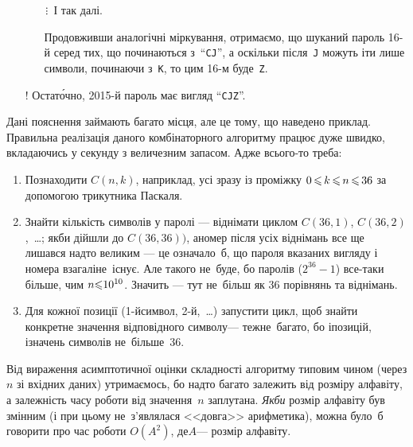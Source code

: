 \documentclass[14pt,a4paper]{extarticle}
\def\dib#1{\,#1\discretionary{}{\mbox{$#1$}}{}\,}
\begin{document}
\begin{small}
\begin{itemize}[leftmargin=*,itemsep=0pt,partopsep=0pt,topsep=0pt,parsep=0pt]
\begin{itemize}[leftmargin=*,itemsep=0pt,partopsep=0pt,topsep=0pt,parsep=0pt]
\item[$\isdiv$] І так далі.

\item[\textopenbullet] Продовживши аналогічні міркування, отримаємо, що шуканий пароль 16-й серед тих, що починаються з~``\texttt{CJ}'', а оскільки після~\texttt{J} можуть іти лише символи, починаючи з~\texttt{K}, то цим 16-м буде~\texttt{Z}.
\end{itemize}

\item[!] Остат\'{о}чно, 2015-й пароль має вигляд ``\texttt{CJZ}''.
\end{itemize}
\end{small}

Дані пояснення займають багато місця, але це тому, що наведено приклад. Правильна реалізація даного комбінаторного алгоритму працює дуже швидко, вкладаючись у секунду з величезним запасом. Адже всього-то треба:

\begin{enumerate}

\item
Познаходити $C(n,k)$, наприклад, усі зразу із проміжку $0\dib{{\<}}k\dib{{\<}}n\dib{{\<}}36$ за допомогою трикутника Паскаля.

\item
Знайти кількість символів у паролі --- віднімати циклом $C(36,1)$, $C(36,2)$,~\dots; якби дійшли до $C(36,36))$, а\nolinebreak[3] номер після усіх віднімань все ще лишався надто великим --- це означало~б, що пароля вказаних вигляду і номера взагалі\nolinebreak[2] не~існує. Але такого не~буде, бо паролів ($2^{36}-1$) все-таки більше, чим $n{\leqslant}10^{10}$. Значить --- тут %
не~більш як 36 порівнянь та віднімань.

\item
Для кожної позиції (1-й\nolinebreak[3] символ, 2-й,~\dots) запустити цикл, щоб знайти конкретне значення відповідного символу\nolinebreak[3] --- теж\nolinebreak[3] не~багато, бо і\nolinebreak[3] позицій, і\nolinebreak[3] значень символів не~більше~36.

\end{enumerate}

Від вираження асимптотичної оцінки складності алгоритму типовим чином (через $n$ зі вхідних даних) утримаємось, бо надто багато залежить від розміру алфавіту, а залежність часу роботи від значення~$n$ заплутана.
\emph{Якби} розмір алфавіту був змінним (і при цьому не~з'являлася <<довга>> арифметика), можна було~б говорити про час роботи $O(A^2)$, де\nolinebreak[3] $A$\nolinebreak[3] --- розмір алфавіту. 
\end{document}
